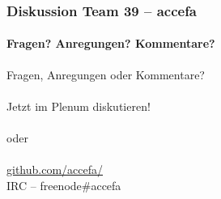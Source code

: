 \begin{frame}\thispagestyle{empty}
	\frametitle{Diskussion \hfill{} \footnotesize{Team 39 -- accefa}}
	\framesubtitle{Fragen? Anregungen? Kommentare?}
	\begin{center}
		\Large
		Fragen, Anregungen oder Kommentare?\\~\\
		Jetzt im Plenum diskutieren!\\~\\
		oder\\~\\
		\url{github.com/accefa/}\\
		IRC -- freenode\#accefa
	\end{center}
\end{frame}
